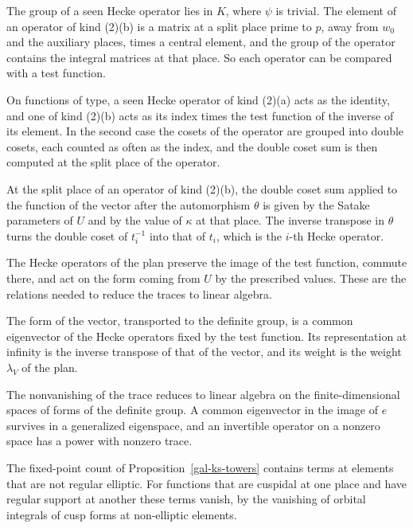 The group of a seen Hecke operator lies in $K$, where $\psi$ is trivial. The element of an operator of kind
(2)(b) is a matrix at a split place prime to $p$, away from $w_0$ and the auxiliary places, times a central
element, and the group of the operator contains the integral matrices at that place. So each operator can
be compared with a test function.

On functions of type, a seen Hecke operator of kind (2)(a) acts as the identity, and one of kind (2)(b) acts
as its index times the test function of the inverse of its element. In the second case the cosets of the
operator are grouped into double cosets, each counted as often as the index, and the double coset sum is
then computed at the split place of the operator.

At the split place of an operator of kind (2)(b), the double coset sum applied to the function of the vector
after the automorphism $\theta$ is given by the Satake parameters of $U$ and by the value of $\kappa$ at that
place. The inverse transpose in $\theta$ turns the double coset of $t_i^{-1}$ into that of $t_i$, which is
the $i$-th Hecke operator.

The Hecke operators of the plan preserve the image of the test function, commute there, and act on the
form coming from $U$ by the prescribed values. These are the relations needed to reduce the traces to
linear algebra.

The form of the vector, transported to the definite group, is a common eigenvector of the Hecke operators
fixed by the test function. Its representation at infinity is the inverse transpose of that of the vector,
and its weight is the weight $\lambda_V$ of the plan.

The nonvanishing of the trace reduces to linear algebra on the finite-dimensional spaces of forms of the
definite group. A common eigenvector in the image of $e$ survives in a generalized eigenspace, and an
invertible operator on a nonzero space has a power with nonzero trace.

The fixed-point count of Proposition~\ref{gal-ks-towers} contains terms at elements that are not regular
elliptic. For functions that are cuspidal at one place and have regular support at another these terms
vanish, by the vanishing of orbital integrals of cusp forms at non-elliptic elements.

